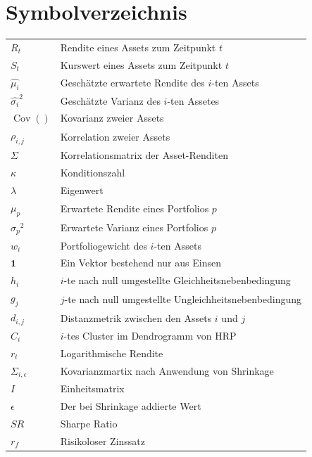 \documentclass[parskip=half]{scrartcl}
\begin{document}
	\section*{Symbolverzeichnis}
	\begin{tabular}{lp{12cm}}
		$R_t$ & Rendite eines Assets zum Zeitpunkt $t$ \\
		$S_t$ & Kurswert eines Assets zum Zeitpunkt $t$ \\
		$\hat{\mu_i}$ & Geschätzte erwartete Rendite des $i$-ten Assets \\
		$\hat{\sigma_i}^2$ & Geschätzte Varianz des $i$-ten Assetes \\
		$\operatorname{Cov}()$ & Kovarianz zweier Assets \\
		$\rho_{i,j}$ & Korrelation zweier Assets \\
		$\Sigma$ & Korrelationsmatrix der Asset-Renditen \\
		$\kappa$ & Konditionszahl \\
		$\lambda$ & Eigenwert \\
		$\mu_p$ & Erwartete Rendite eines Portfolios $p$ \\
		${\sigma_p}^2$ & Erwartete Varianz eines Portfolios $p$ \\
		$w_i$ & Portfoliogewicht des $i$-ten Assets \\
		$\mathbf{1}$ & Ein Vektor bestehend nur aus Einsen \\
		$h_i$ & $i$-te nach null umgestellte Gleichheitsnebenbedingung \\
		$g_j$ & $j$-te nach null umgestellte  Ungleichheitsnebenbedingung \\
		$d_{i,j}$ & Distanzmetrik zwischen den Assets $i$ und $j$ \\
		$C_i$ & $i$-tes Cluster im Dendrogramm von HRP \\
		$r_t$ & Logarithmische Rendite \\
		$\Sigma_{i, \epsilon}$ & Kovarianzmartix nach Anwendung von Shrinkage \\
		$I$ & Einheitsmatrix \\
		$\epsilon$ & Der bei Shrinkage addierte Wert \\
		$SR$ & Sharpe Ratio \\
		$r_f$ & Risikoloser Zinssatz \\
	\end{tabular}
	
\end{document}
